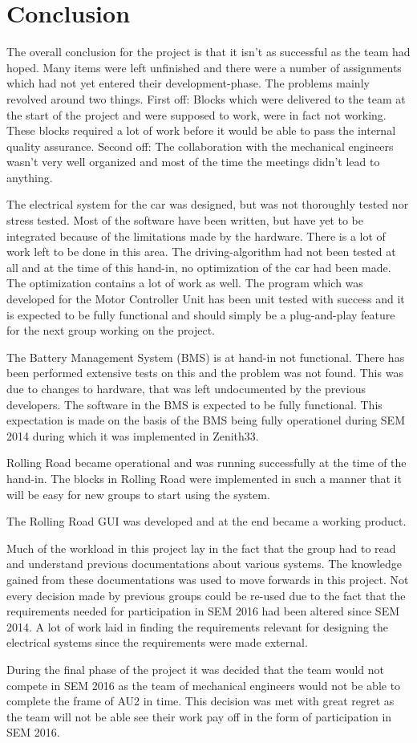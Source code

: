 \chapter{Conclusion}
The overall conclusion for the project is that it isn't as successful as the team had hoped. Many items were left unfinished and there were a number of assignments which had not yet entered their development-phase. The problems mainly revolved around two things. First off: Blocks which were delivered to the team at the start of the project and were supposed to work, were in fact not working. These blocks required a lot of work before it would be able to pass the internal quality assurance. Second off: The collaboration with the mechanical engineers wasn't very well organized and most of the time the meetings didn't lead to anything.   

The electrical system for the car was designed, but was not thoroughly tested nor stress tested. Most of the software have been written, but have yet to be integrated because of the limitations made by the hardware. There is a lot of work left to be done in this area. The driving-algorithm had not been tested at all and at the time of this hand-in, no optimization of the car had been made. The optimization contains a lot of work as well. The program which was developed for the Motor Controller Unit has been unit tested with success and it is expected to be fully functional and should simply be a plug-and-play feature for the next group working on the project. 

The Battery Management System (BMS) is at hand-in not functional. There has been performed extensive tests on this and the problem was not found. This was due to changes to hardware, that was left undocumented by the previous developers. The software in the BMS is expected to be fully functional. This expectation is made on the basis of the BMS being fully operationel during SEM 2014 during which it was implemented in Zenith33.

Rolling Road became operational and was running successfully at the time of the hand-in. The blocks in Rolling Road were implemented in such a manner that it will be easy for new groups to start using the system. 

The Rolling Road GUI was developed and at the end became a working product.

Much of the workload in this project lay in the fact that the group had to read and understand previous documentations about various systems. The knowledge gained from these documentations was used to move forwards in this project. Not every decision made by previous groups could be re-used due to the fact that the requirements needed for participation in SEM 2016 had been altered since SEM 2014. A lot of work laid in finding the requirements relevant for designing the electrical systems since the requirements were made external.

During the final phase of the project it was decided that the team would not compete in SEM 2016 as the team of mechanical engineers would not be able to complete the frame of AU2 in time. This decision was met with great regret as the team will not be able see their work pay off in the form of participation in SEM 2016.